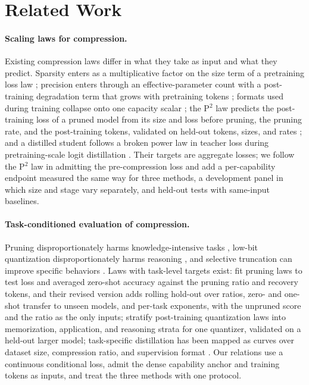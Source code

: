 \section{Related Work}
\label{sec:related}

\paragraph{Scaling laws for compression.} Existing compression laws
differ in what they take as input and what they predict. Sparsity
enters as a multiplicative factor on the size term of a pretraining
loss law \citep{frantar2023scaling}; precision enters through an
effective-parameter count with a post-training degradation term that
grows with pretraining tokens \citep{kumar2024scaling}; formats used
during training collapse onto one capacity scalar
\citep{panferov2025unified}; the P$^2$ law predicts the post-training
loss of a pruned model from its size and loss before pruning, the
pruning rate, and the post-training tokens, validated on held-out
tokens, sizes, and rates \citep{zhang2024scaling}; and a distilled
student follows a broken power law in teacher loss during
pretraining-scale logit distillation \citep{busbridge2025distillation}.
Their targets are aggregate losses; we follow the P$^2$ law in
admitting the pre-compression loss and add a per-capability endpoint
measured the same way for three methods, a development panel in which
size and stage vary separately, and held-out tests with same-input
baselines.

\paragraph{Task-conditioned evaluation of compression.} Pruning
disproportionately harms knowledge-intensive tasks
\citep{jaiswal2023compressing}, low-bit quantization disproportionately
harms reasoning \citep{liu2025quantization}, and selective truncation
can improve specific behaviors \citep{sharma2023laser}. Laws with
task-level targets exist: \citet{sengupta2025compression} fit pruning
laws to test loss and averaged zero-shot accuracy against the pruning
ratio and recovery tokens, and their revised version adds rolling
hold-out over ratios, zero- and one-shot transfer to unseen models,
and per-task exponents, with the unpruned score and the ratio as the
only inputs; \citet{zhou2025task} stratify post-training quantization
laws into memorization, application, and reasoning strata for one
quantizer, validated on a held-out larger model; task-specific
distillation has been mapped as curves over dataset size, compression
ratio, and supervision format \citep{ghita2026task}. Our relations use a
continuous conditional loss, admit the dense capability anchor and
training tokens as inputs, and treat the three methods with one
protocol.

